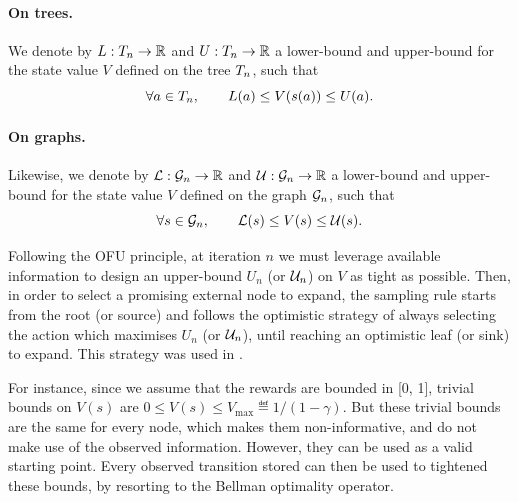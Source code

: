\documentclass[runningheads]{llncs}
\begin{document}
\begin{definition}
\paragraph{\textbf{On trees.}} We denote by $L:T_n \rightarrow \mathbb{R}$ and  $U:T_n \rightarrow \mathbb{R}$ a lower-bound and upper-bound for the state value $V$ defined on the tree $T_n$, such that
\begin{equation*}
    \forall a\in T_n, \qquad L(a) \leq V(s(a)) \leq U(a).
\end{equation*}

\paragraph{\textbf{On graphs.}} Likewise, we denote by $\mathcal{L}:\mathcal{G}_n \rightarrow \mathbb{R}$ and  $\mathcal{U}:\mathcal{G}_n \rightarrow \mathbb{R}$ a lower-bound and upper-bound for the state value $V$ defined on the graph $\mathcal{G}_n$, such that
\begin{equation*}
\forall s\in\mathcal{G}_n, \qquad \mathcal{L}(s) \leq V(s) \leq \mathcal{U}(s).
\end{equation*}
\end{definition}

Following the OFU principle, at iteration $n$ we must leverage available information to design an upper-bound $U_n$ (or $\mathcal{U}_n$) on $V$ as tight as possible. Then, in order to select a promising external node to expand, the sampling rule starts from the root (or source) and follows the optimistic strategy of always selecting the action which maximises $U_n$ (or $\mathcal{U}_n$), until reaching an optimistic leaf (or sink) to expand. This strategy was used in \citep[e.g.][]{Kocsis06UCT, Hren2008optimistic, Bubeck2010open, Busoniu2012optimistic}.

For instance, since we assume that the rewards are bounded in [0, 1], trivial bounds on $V(s)$ are
$0 \leq V(s) \leq V_{\max} \eqdef {1}/({1-\gamma})$. But these trivial bounds are the same for every node, which makes them non-informative, and do not make use of the observed information. However, they can be used as a valid starting point. Every observed transition stored can then be used to tightened these bounds, by resorting to the Bellman optimality operator.
\end{document}
